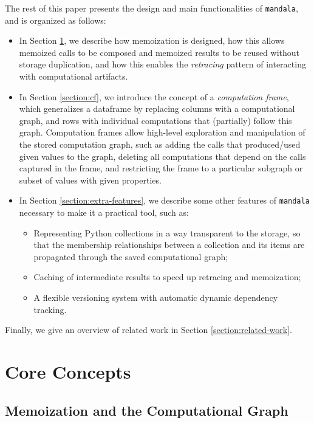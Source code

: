 \documentclass{article} %
\begin{document}
The rest of this paper presents the design and main functionalities of
\texttt{mandala}, and is organized as follows: 
\begin{itemize}
\item In Section \ref{section:core-concepts}, we describe how memoization is
designed, how this allows memoized calls to be composed and memoized results to
be reused without storage duplication, and how this enables the \emph{retracing}
pattern of interacting with computational artifacts.
\item In Section \ref{section:cf}, we introduce the concept of a
\emph{computation frame}, which generalizes a dataframe by replacing columns
with a computational graph, and rows with individual computations that
(partially) follow this graph. Computation frames allow high-level exploration
and manipulation of the stored computation graph, such as adding the calls that
produced/used given values to the graph, deleting all computations that depend
on the calls captured in the frame, and restricting the frame to a particular
subgraph or subset of values with given properties.
\item In Section \ref{section:extra-features}, we describe some other features of
\texttt{mandala} necessary to make it a practical tool, such as:
\begin{itemize}
\item Representing Python collections in a way transparent to the storage, so
that the membership relationships between a collection and its items are
propagated through the saved computational graph;
\item Caching of intermediate results to speed up retracing and memoization;
\item A flexible versioning system with automatic dynamic dependency tracking.
\end{itemize}
\end{itemize}

Finally, we give an overview of related work in Section \ref{section:related-work}.

\section{Core Concepts}
\label{section:core-concepts}

\subsection{Memoization and the Computational Graph}
\end{document}

